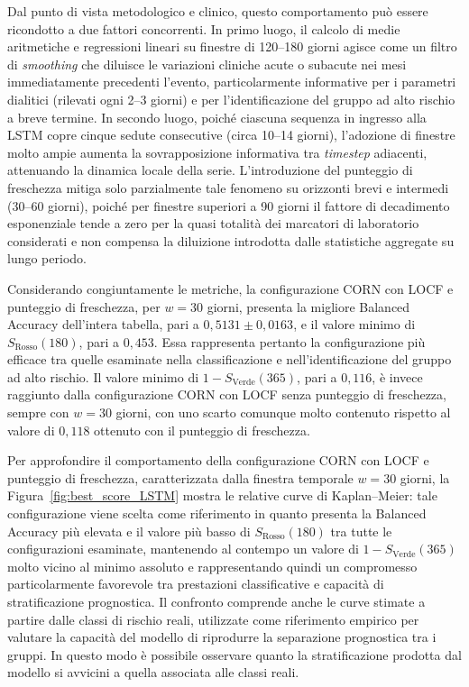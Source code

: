 \documentclass[a4paper,12pt]{report}
\begin{document}
Dal punto di vista metodologico e clinico, questo comportamento può essere ricondotto a due fattori concorrenti. In primo luogo, il calcolo di medie aritmetiche e regressioni lineari su finestre di 120--180 giorni agisce come un filtro di \textit{smoothing} che diluisce le variazioni cliniche acute o subacute nei mesi immediatamente precedenti l'evento, particolarmente informative per i parametri dialitici (rilevati ogni 2--3 giorni) e per l'identificazione del gruppo ad alto rischio a breve termine. In secondo luogo, poiché ciascuna sequenza in ingresso alla LSTM copre cinque sedute consecutive (circa 10--14 giorni), l'adozione di finestre molto ampie aumenta la sovrapposizione informativa tra \textit{timestep} adiacenti, attenuando la dinamica locale della serie. L'introduzione del punteggio di freschezza mitiga solo parzialmente tale fenomeno su orizzonti brevi e intermedi (30--60 giorni), poiché per finestre superiori a 90 giorni il fattore di decadimento esponenziale tende a zero per la quasi totalità dei marcatori di laboratorio considerati e non compensa la diluizione introdotta dalle statistiche aggregate su lungo periodo.

Considerando congiuntamente le metriche, la configurazione CORN con LOCF e punteggio di freschezza, per \(w=30\) giorni, presenta la migliore Balanced Accuracy dell'intera tabella, pari a \(0{,}5131 \pm 0{,}0163\), e il valore minimo di \(S_{\text{Rosso}}(180)\), pari a \(0{,}453\). Essa rappresenta pertanto la configurazione più efficace tra quelle esaminate nella classificazione e nell'identificazione del gruppo ad alto rischio. Il valore minimo di \(1-S_{\text{Verde}}(365)\), pari a \(0{,}116\), è invece raggiunto dalla configurazione CORN con LOCF senza punteggio di freschezza, sempre con \(w=30\) giorni, con uno scarto comunque molto contenuto rispetto al valore di \(0{,}118\) ottenuto con il punteggio di freschezza.

Per approfondire il comportamento della configurazione CORN con LOCF e punteggio di freschezza, caratterizzata dalla finestra temporale \(w=30\) giorni, la Figura~\ref{fig:best_score_LSTM} mostra le relative curve di Kaplan--Meier: tale configurazione viene scelta come riferimento in quanto presenta la Balanced Accuracy più elevata e il valore più basso di \(S_{\text{Rosso}}(180)\) tra tutte le configurazioni esaminate, mantenendo al contempo un valore di \(1-S_{\text{Verde}}(365)\) molto vicino al minimo assoluto e rappresentando quindi un compromesso particolarmente favorevole tra prestazioni classificative e capacità di stratificazione prognostica. Il confronto comprende anche le curve stimate a partire dalle classi di rischio reali, utilizzate come riferimento empirico per valutare la capacità del modello di riprodurre la separazione prognostica tra i gruppi. In questo modo è possibile osservare quanto la stratificazione prodotta dal modello si avvicini a quella associata alle classi reali.
\end{document}
